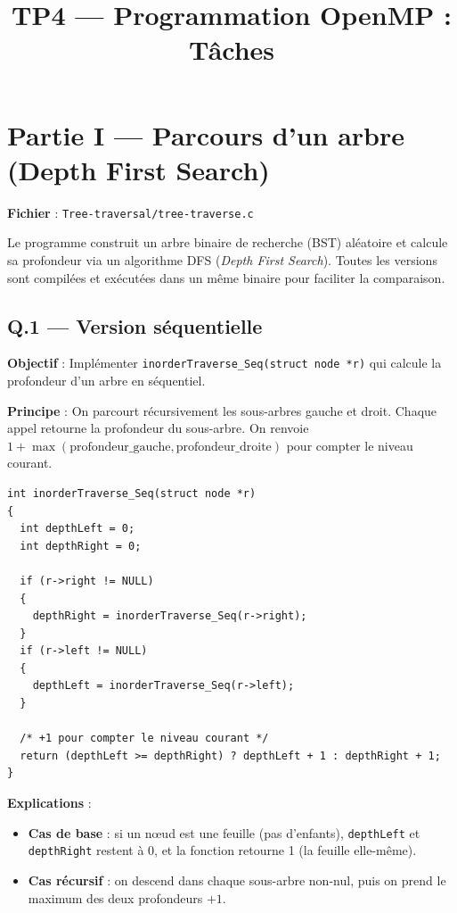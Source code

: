 \documentclass[12pt,a4paper]{article}
\title{\textbf{TP4 --- Programmation OpenMP : Tâches}}
\author{}
\date{}
\begin{document}
\maketitle
\tableofcontents
\newpage

\section{Partie I --- Parcours d'un arbre (Depth First Search)}

\textbf{Fichier} : \texttt{Tree-traversal/tree-traverse.c}

Le programme construit un arbre binaire de recherche (BST) aléatoire et calcule
sa profondeur via un algorithme DFS (\textit{Depth First Search}). Toutes les
versions sont compilées et exécutées dans un même binaire pour faciliter la
comparaison.

\subsection{Q.1 --- Version séquentielle}

\textbf{Objectif} : Implémenter \texttt{inorderTraverse\_Seq(struct node *r)}
qui calcule la profondeur d'un arbre en séquentiel.

\textbf{Principe} : On parcourt récursivement les sous-arbres gauche et droit.
Chaque appel retourne la profondeur du sous-arbre. On renvoie
$1 + \max(\text{profondeur\_gauche}, \text{profondeur\_droite})$ pour compter le
niveau courant.

\begin{lstlisting}[caption={Version séquentielle --- Q.1}]
int inorderTraverse_Seq(struct node *r)
{
  int depthLeft = 0;
  int depthRight = 0;

  if (r->right != NULL)
  {
    depthRight = inorderTraverse_Seq(r->right);
  }
  if (r->left != NULL)
  {
    depthLeft = inorderTraverse_Seq(r->left);
  }

  /* +1 pour compter le niveau courant */
  return (depthLeft >= depthRight) ? depthLeft + 1 : depthRight + 1;
}
\end{lstlisting}

\textbf{Explications} :
\begin{itemize}
  \item \textbf{Cas de base} : si un n\oe ud est une feuille (pas d'enfants),
    \texttt{depthLeft} et \texttt{depthRight} restent à 0, et la fonction
    retourne 1 (la feuille elle-même).
  \item \textbf{Cas récursif} : on descend dans chaque sous-arbre non-nul, puis
    on prend le maximum des deux profondeurs $+ 1$.
\end{itemize}
\end{document}
